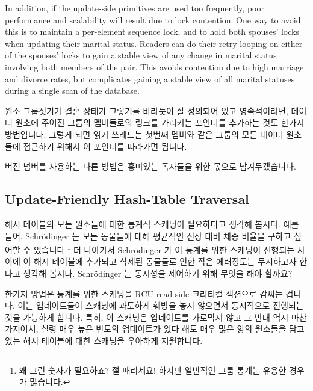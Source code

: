 In addition, if the update-side primitives are used too frequently,
poor performance and scalability will result due to lock contention.
One way to avoid this is to maintain a per-element sequence lock,
and to hold both spouses' locks when updating their marital status.
Readers can do their retry looping on either of the spouses' locks
to gain a stable view of any change in marital status involving both
members of the pair.
This avoids contention due to high marriage and divorce rates, but
complicates gaining a stable view of all marital statuses during a
single scan of the database.
\fi

원소 그룹짓기가 결혼 상태가 그렇기를 바라듯이 잘 정의되어 있고 영속적이라면,
데이터 원소에 주어진 그룹의 멤버들로의 링크를 가리키는 포인터를 추가하는 것도
한가지 방법입니다.
그렇게 되면 읽기 쓰레드는 첫번째 멤버와 같은 그룹의 모든 데이터 원소들에
접근하기 위해서 이 포인터를 따라가면 됩니다.

버전 넘버를 사용하는 다른 방법은 흥미있는 독자들을 위한 몫으로 남겨두겠습니다.
\iffalse

If the element groupings are well-defined and persistent, which marital
status is hoped to be,
then one approach is to add pointers to the data elements to link
together the members of a given group.
Readers can then traverse these pointers to access all the data elements
in the same group as the first one located.

Other approaches using version numbering are left as exercises for the
interested reader.
\fi

\subsection{Update-Friendly Hash-Table Traversal}
\label{sec:together:Update-Friendly Hash-Table Traversal}

해시 테이블의 모든 원소들에 대한 통계적 스캐닝이 필요하다고 생각해 봅시다.
예를 들어, Schr\"odinger 는 모든 동물들에 대해 평균적인 신장 대비 체중 비율을
구하고 싶어할 수 있습니다.\footnote{
	왜 그런 숫자가 필요하죠?
	절 때리세요!
	하지만 일반적인 그룹 통계는 유용한 경우가 많습니다.}
더 나아가서 Schr\"odinger 가 이 통계를 위한 스캐닝이 진행되는 사이에 이 해시
테이블에 추가되고 삭제된 동물들로 인한 작은 에러정도는 무시하고자 한다고 생각해
봅시다.
Schr\"odinger 는 동시성을 제어하기 위해 무엇을 해야 할까요?

한가지 방법은 통계를 위한 스캐닝을 RCU read-side 크리티컬 섹션으로 감싸는
겁니다.
이는 업데이트들이 스캐닝에 과도하게 훼방을 놓지 않으면서 동시적으로 진행되는
것을 가능하게 합니다.
특히, 이 스캐닝은 업데이트를 가로막지 않고 그 반대 역시 마찬가지여서, 설령 매우
높은 빈도의 업데이트가 있다 해도 매우 많은 양의 원소들을 담고 있는 해시
테이블에 대한 스캐닝을 우아하게 지원합니다.
\iffalse

